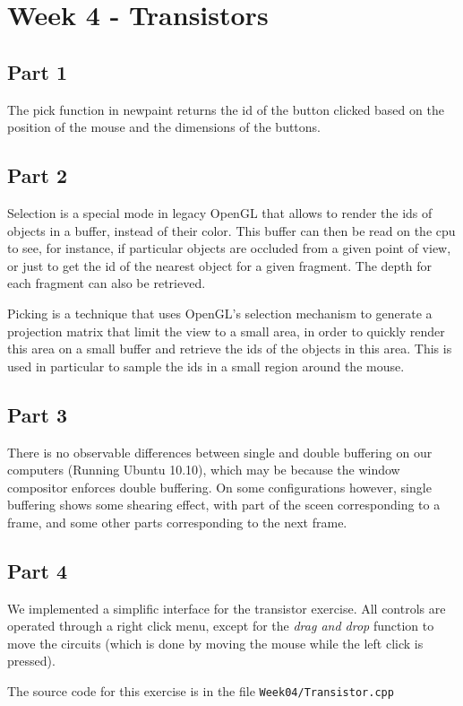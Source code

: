 \chapter{Week 4 - Transistors}

\section{Part 1}
The pick function in newpaint returns the id of the button clicked based on the position of the mouse and the dimensions of the buttons.

\section{Part 2}

Selection is a special mode in legacy OpenGL that allows to render the ids of objects in a buffer, instead of their color. This buffer can then be read on the cpu to see, for instance, if particular objects are occluded from a given point of view, or just to get the id of the nearest object for a given fragment. The depth for each fragment can also be retrieved.

Picking is a technique that uses OpenGL's selection mechanism to generate a projection matrix that limit the view to a small area, in order to quickly render this area on a small buffer and retrieve the ids of the objects in this area. This is used in particular to sample the ids in a small region around the mouse.

\section{Part 3}

There is no observable differences between single and double buffering on our computers (Running Ubuntu 10.10), which may be because the window compositor enforces double buffering. On some configurations however, single buffering shows some shearing effect, with part of the sceen corresponding to a frame, and some other parts corresponding to the next frame.

\section{Part 4}

We implemented a simplific interface for the transistor exercise. All controls are operated through a right click menu, except for the \textit{drag and drop} function to move the circuits (which is done by moving the mouse while the left click is pressed).

The source code for this exercise is in the file \texttt{Week04/Transistor.cpp}



